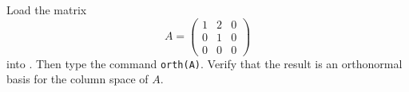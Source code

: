 \documentclass{ximera}
\begin{document}
\begin{exercise} \label{c7.4.3}
Load the matrix
\[
A=\left(\begin{array}{rrr} 1 & 2 & 0\\ 0 & 1 & 0\\
0 & 0 & 0\end{array}\right)
\]
into \Matlabp.  Then type the command {\tt orth(A)}.
Verify that the result is an orthonormal basis for the column space of $A$.

\begin{solution}



\end{solution}
\end{exercise}
\end{document}
